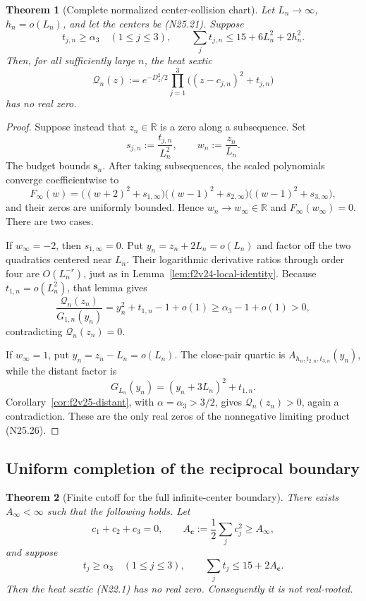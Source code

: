 \documentclass[11pt]{article}
\newtheorem{theorem}{Theorem}[section]
\theoremstyle{definition}
\theoremstyle{remark}
\begin{document}
\begin{theorem}[Complete normalized center-collision chart]
\label{thm:f2v25-collision}
Let \(L_n\to\infty\), \(h_n=o(L_n)\), and let the centers be
\textup{(N25.21)}.  Suppose
\[
 t_{j,n}\geq\alpha_3\quad(1\leq j\leq3),\qquad
 \sum_jt_{j,n}\leq15+6L_n^2+2h_n^2.
 \tag{N25.23}
\]
Then, for all sufficiently large \(n\), the heat sextic
\[
 \mathcal Q_n(z):=
 e^{-D_z^2/2}\prod_{j=1}^3
 \bigl((z-c_{j,n})^2+t_{j,n}\bigr)
 \tag{N25.24}
\]
has no real zero.
\end{theorem}

\begin{proof}
Suppose instead that \(z_n\in\mathbb R\) is a zero along a subsequence.
Set
\[
 s_{j,n}:=\frac{t_{j,n}}{L_n^2},\qquad
 w_n:=\frac{z_n}{L_n}.
 \tag{N25.25}
\]
The budget bounds \(\bm s_n\).  After taking subsequences, the scaled
polynomials converge coefficientwise to
\[
 F_\infty(w)
 =\bigl((w+2)^2+s_{1,\infty}\bigr)
  \bigl((w-1)^2+s_{2,\infty}\bigr)
  \bigl((w-1)^2+s_{3,\infty}\bigr),
 \tag{N25.26}
\]
and their zeros are uniformly bounded.  Hence \(w_n\to w_\infty\in
\mathbb R\) and \(F_\infty(w_\infty)=0\).  There are two cases.

If \(w_\infty=-2\), then \(s_{1,\infty}=0\).  Put
\(y_n=z_n+2L_n=o(L_n)\) and factor off the two quadratics centered near
\(L_n\).  Their logarithmic derivative ratios through order four are
\(O(L_n^{-r})\), just as in Lemma~\ref{lem:f2v24-local-identity}.
Because \(t_{1,n}=o(L_n^2)\), that lemma gives
\[
 \frac{\mathcal Q_n(z_n)}{G_{1,n}(y_n)}
 =y_n^2+t_{1,n}-1+o(1)
 \geq\alpha_3-1+o(1)>0,
 \tag{N25.27}
\]
contradicting \(\mathcal Q_n(z_n)=0\).

If \(w_\infty=1\), put \(y_n=z_n-L_n=o(L_n)\).  The close-pair quartic
is \(A_{h_n,t_{2,n},t_{3,n}}(y_n)\), while the distant factor is
\[
 G_{L_n}(y_n)=(y_n+3L_n)^2+t_{1,n}.
 \tag{N25.28}
\]
Corollary~\ref{cor:f2v25-distant}, with
\(\alpha=\alpha_3>3/2\), gives
\(\mathcal Q_n(z_n)>0\), again a contradiction.  These are the only real
zeros of the nonnegative limiting product \textup{(N25.26)}.
\end{proof}

\subsection{Uniform completion of the reciprocal boundary}
\label{subsec:f2v25-completion}

\begin{theorem}[Finite cutoff for the full infinite-center boundary]
\label{thm:f2v25-infinite-cutoff}
There exists \(A_\infty<\infty\) such that the following holds.  Let
\[
 c_1+c_2+c_3=0,\qquad
 A_{\bm c}:=\frac12\sum_jc_j^2\geq A_\infty,
 \tag{N25.29}
\]
and suppose
\[
 t_j\geq\alpha_3\quad(1\leq j\leq3),\qquad
 \sum_jt_j\leq15+2A_{\bm c}.
 \tag{N25.30}
\]
Then the heat sextic \textup{(N22.1)} has no real zero.  Consequently it
is not real-rooted.
\end{theorem}
\end{document}

